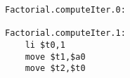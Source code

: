 \documentclass[8pt,a4paper,compress]{beamer}
\begin{document}
\begin{frame}[fragile]
\begin{lstlisting}[language={},style=focusin]
Factorial.computeIter.0:                                                                                                                                                                                                                      
                                                                                                                                                                                                                                              
Factorial.computeIter.1:                                                                                                                                                                                                                      
    li $t0,1
    move $t1,$a0
    move $t2,$t0
\end{lstlisting}
\end{frame}
\end{document}
